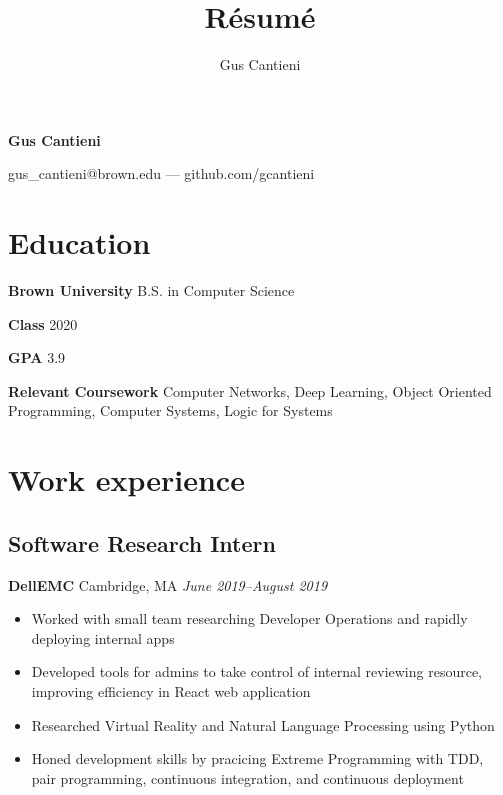 \documentclass[11pt]{article}
\title{R\'esum\'e}
\author{Gus Cantieni}
\makeatletter
\renewcommand{\maketitle}{
	\begin{center}
		{\huge\bfseries Gus Cantieni}
		\vspace{0.20em}

		gus\_cantieni@brown.edu --- github.com/gcantieni
		\vspace{-1.50em}
	\end{center}
}
\makeatother
\begin{document}
\maketitle
\section{Education}
\begin{minipage}{20em}
	\textbf{Brown University} B.S. in Computer Science

	\textbf{Class} 2020

	\textbf{GPA} 3.9

\end{minipage}
\begin{minipage}{25em}

	\textbf{Relevant Coursework} Computer Networks, Deep Learning, Object Oriented Programming, Computer Systems, Logic for Systems
\end{minipage}

\section{Work experience} 
\subsection{Software Research Intern} 
\textbf{DellEMC} Cambridge, MA \hfill \textit{June 2019--August 2019}
\begin{itemize}
	\item Worked with small team researching Developer Operations and rapidly deploying internal apps
	\item Developed tools for admins to take control of internal reviewing resource, improving efficiency in React web application
	\item Researched Virtual Reality and Natural Language Processing using Python
	\item Honed development skills by pracicing Extreme Programming with TDD, pair programming, continuous integration, and continuous deployment
\end{itemize}
\end{document}
